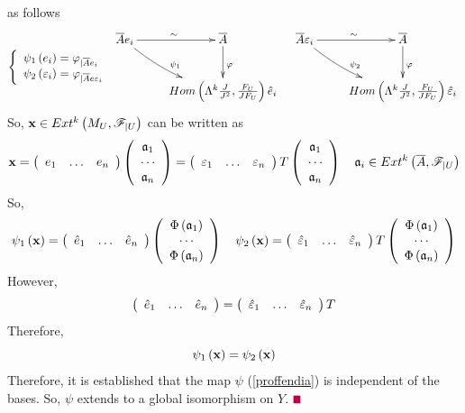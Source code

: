 \documentclass[12pt]{article}
\begin{document}
as follows
$$
\LBrace{{l}
\psi_1\LRf{e_i}=\varphi_{|\overline{A}e_i}\\
\psi_2\LRf{\varepsilon_i}=\varphi_{|\overline{A}e\varepsilon_i}\\
}
\diagram 
\overline{A}e_i \ar[r]^{\sim}\ar@/_/[dr]^{\psi_1} & \overline{A}\ar[d]^{\varphi}\\
& {H}om\LRf{\Lambda^k\frac{{J}}{{J}^2}, \frac{F_U}{{J}{F}_U}}\hat{e}_i\\
\enddiagram
\quad
\diagram 
\overline{A}\varepsilon_i \ar[r]^{\sim}\ar@/_/[dr]^{\psi_2} & \overline{A}\ar[d]^{\varphi}\\
& {H}om\LRf{\Lambda^k\frac{{J}}{{J}^2}, \frac{F_U}{{J}{F}_U}}\hat{\varepsilon}_i\\
\enddiagram
$$
%
So, ${\bf x}\in {E}xt^k\LRf{M_U, {\SF}_{|U}}$ can be written as
$$
{\bf x}=\matrix{{ccc} e_1 & \ldots & e_n}\matrix{{c}\a_1\\ \cdots \\ \a_n\\}
= \matrix{{ccc} \varepsilon_1 & \ldots & \varepsilon_n}T\matrix{{c}\a_1\\ \cdots \\ \a_n\\}
\quad \a_i\in {E}xt^k\LRf{\overline{A}, {\SF}_{|U}}
$$
So,
$$
\psi_1\LRf{{\bf x}} =
\matrix{{ccc} \hat{e}_1 & \ldots & \hat{e}_n}\matrix{{c}\Phi\LRf{\a_1}\\ \cdots \\ \Phi\LRf{\a_n}\\}
\quad 
\psi_2\LRf{{\bf x}} =
\matrix{{ccc} \hat{\varepsilon}_1 & \ldots & \hat{\varepsilon}_n}T\matrix{{c}\Phi\LRf{\a_1}\\ \cdots \\ \Phi\LRf{\a_n}\\}
$$
However, 
$$
\matrix{{ccc} \hat{e}_1 & \ldots & \hat{e}_n}= \matrix{{ccc} \hat{\varepsilon}_1 & \ldots & \hat{\varepsilon}_n}T
$$
Therefore,
$$
\psi_1\LRf{{\bf x}} =\psi_2\LRf{{\bf x}} 
$$
Therefore, it is established that the map $\psi$ (\ref{proffendia}) is independent of the bases. 
 So, $\psi$ extends to a global isomorphism on $Y$. $\eop$ 
 
\end{document}
